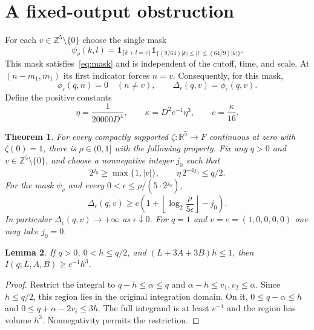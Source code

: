 \documentclass[11pt]{article}
\newtheorem{theorem}{Theorem}
\newtheorem{lemma}[theorem]{Lemma}
\newcommand{\R}{\mathbb R}
\newcommand{\Z}{\mathbb Z}
\newcommand{\ind}{\mathbf 1}
\begin{document}
\section{A fixed-output obstruction}

For each $v\in\Z^5\setminus\{0\}$ choose the single mask
\begin{equation}\label{eq:selected}
 \psi_v(k,l)=\ind_{\{k+l=v\}}
 \ind_{\{(9/64)|k|\le |l|\le(64/9)|k|\}}.
\end{equation}
This mask satisfies~\eqref{eq:mask} and is independent of the cutoff,
time, and scale. At $(n-m_1,m_1)$ its first indicator forces $n=v$.
Consequently, for this mask,
\begin{equation}\label{eq:isolates}
 \phi_\epsilon(q,n)=0\quad(n\ne v),\qquad
 \Delta_\epsilon(q,v)=\phi_\epsilon(q,v).
\end{equation}
Define the positive constants
\begin{equation}\label{eq:constants}
 \eta=\frac1{20000D^4},\qquad
 \kappa=D^2e^{-1}\eta^3,\qquad c=\frac\kappa{16}.
\end{equation}

\begin{theorem}\label{thm:main}
For every compactly supported $\zeta:\R^5\to F$ continuous at zero
with $\zeta(0)=1$, there is $\rho\in(0,1]$ with the following property.
Fix any $q>0$ and $v\in\Z^5\setminus\{0\}$, and choose a nonnegative
integer $j_0$ such that
\[
 2^{j_0}\ge\max\{1,|v|\},\qquad \eta\,2^{-4j_0}\le q/2.
\]
For the mask $\psi_v$ and every $0<\epsilon\le\rho/(5\cdot2^{j_0})$,
\begin{equation}\label{eq:loggrowth}
 \Delta_\epsilon(q,v)\ge
 c\left(1+\left\lfloor\log_2\frac{\rho}{5\epsilon}\right\rfloor-j_0\right).
\end{equation}
In particular $\Delta_\epsilon(q,v)\to+\infty$ as $\epsilon\downarrow0$.
For $q=1$ and $v=e=(1,0,0,0,0)$ one may take $j_0=0$.
\end{theorem}

\begin{lemma}\label{lem:time}
If $q>0$, $0<h\le q/2$, and $(L+3A+3B)h\le1$, then
$I(q;L,A,B)\ge e^{-1}h^3$.
\end{lemma}
\begin{proof}
Restrict the integral to $q-h\le\alpha\le q$ and
$\alpha-h\le v_1,v_2\le\alpha$. Since $h\le q/2$, this region lies
in the original integration domain. On it,
$0\le q-\alpha\le h$ and $0\le q+\alpha-2v_i\le3h$.
The full integrand is at least $e^{-1}$ and the region has volume
$h^3$. Nonnegativity permits the restriction.
\end{proof}
\end{document}
